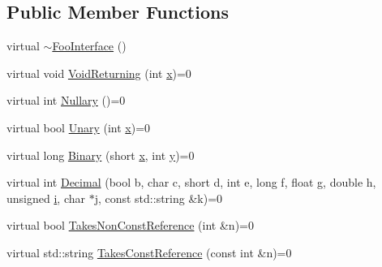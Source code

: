 \subsection*{Public Member Functions}
\begin{DoxyCompactItemize}
\item 
virtual \mbox{\hyperlink{classtesting_1_1gmock__function__mocker__test_1_1_foo_interface_a608b0da2acf1fc3c51f56d55a839edc5}{$\sim$\+Foo\+Interface}} ()
\item 
virtual void \mbox{\hyperlink{classtesting_1_1gmock__function__mocker__test_1_1_foo_interface_ab62327ee683b362d9e5579266b74a09c}{Void\+Returning}} (int \mbox{\hyperlink{_obj__test_2lib_2googletest-master_2googlemock_2test_2gmock-matchers__test_8cc_a6150e0515f7202e2fb518f7206ed97dc}{x}})=0
\item 
virtual int \mbox{\hyperlink{classtesting_1_1gmock__function__mocker__test_1_1_foo_interface_a9440f75381e8a44977c2caee7914098f}{Nullary}} ()=0
\item 
virtual bool \mbox{\hyperlink{classtesting_1_1gmock__function__mocker__test_1_1_foo_interface_a6f28f91c92b59da029ed0cb61c3d1da6}{Unary}} (int \mbox{\hyperlink{_obj__test_2lib_2googletest-master_2googlemock_2test_2gmock-matchers__test_8cc_a6150e0515f7202e2fb518f7206ed97dc}{x}})=0
\item 
virtual long \mbox{\hyperlink{classtesting_1_1gmock__function__mocker__test_1_1_foo_interface_a8d6e54401a3addca464903257529ace4}{Binary}} (short \mbox{\hyperlink{_obj__test_2lib_2googletest-master_2googlemock_2test_2gmock-matchers__test_8cc_a6150e0515f7202e2fb518f7206ed97dc}{x}}, int \mbox{\hyperlink{_obj__test_2lib_2googletest-master_2googlemock_2test_2gmock-matchers__test_8cc_a39cb44155237f0205e0feb931d5acbed}{y}})=0
\item 
virtual int \mbox{\hyperlink{classtesting_1_1gmock__function__mocker__test_1_1_foo_interface_a2a415a61b9a9c7a69bba9a4b5ef2a63e}{Decimal}} (bool b, char c, short d, int e, long f, float g, double h, unsigned \mbox{\hyperlink{_obj__test_2lib_2googletest-master_2googlemock_2test_2gmock-matchers__test_8cc_acb559820d9ca11295b4500f179ef6392}{i}}, char $\ast$j, const std\+::string \&k)=0
\item 
virtual bool \mbox{\hyperlink{classtesting_1_1gmock__function__mocker__test_1_1_foo_interface_aaf21cef138ffa4a8f2372c7fbed95b18}{Takes\+Non\+Const\+Reference}} (int \&n)=0
\item 
virtual std\+::string \mbox{\hyperlink{classtesting_1_1gmock__function__mocker__test_1_1_foo_interface_a4765c543c11b5d544a35f9fe8de758bd}{Takes\+Const\+Reference}} (const int \&n)=0

\end{DoxyCompactItemize}
